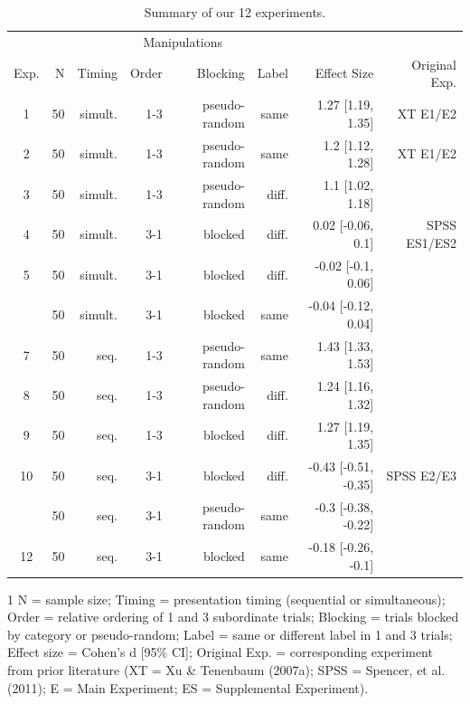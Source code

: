 \documentclass[english,floatsintext,man]{apa6}
\theoremstyle{definition}
\theoremstyle{definition}
\theoremstyle{definition}
\theoremstyle{remark}
\begin{document}
\begin{table}

\begin{threeparttable}
\caption{\label{tab:unnamed-chunk-2}Summary of our 12 experiments.}
\centering
\fontsize{12}{14}\selectfont
\begin{tabular}[t]{crrrrrrr}
\toprule
\multicolumn{2}{c}{ } & \multicolumn{4}{c}{Manipulations} & \multicolumn{1}{c}{ } \\
\cmidrule(l{2pt}r{2pt}){3-6}
Exp. & N & Timing & Order & Blocking & Label & Effect Size & Original 
Exp.\\
\midrule
1 & 50 & simult. & 1-3 & pseudo-random & same & 1.27 [1.19, 1.35] & XT E1/E2\\
2 & 50 & simult. & 1-3 & pseudo-random & same & 1.2 [1.12, 1.28] & XT E1/E2\\
3 & 50 & simult. & 1-3 & pseudo-random & diff. & 1.1 [1.02, 1.18] & \\
4 & 50 & simult. & 3-1 & blocked & diff. & 0.02 [-0.06, 0.1] & SPSS ES1/ES2\\
5 & 50 & simult. & 3-1 & blocked & diff. & -0.02 [-0.1, 0.06] & \\
\addlinespace
6 & 50 & simult. & 3-1 & blocked & same & -0.04 [-0.12, 0.04] & \\
7 & 50 & seq. & 1-3 & pseudo-random & same & 1.43 [1.33, 1.53] & \\
8 & 50 & seq. & 1-3 & pseudo-random & diff. & 1.24 [1.16, 1.32] & \\
9 & 50 & seq. & 1-3 & blocked & diff. & 1.27 [1.19, 1.35] & \\
10 & 50 & seq. & 3-1 & blocked & diff. & -0.43 [-0.51, -0.35] & SPSS E2/E3\\
\addlinespace
11 & 50 & seq. & 3-1 & pseudo-random & same & -0.3 [-0.38, -0.22] & \\
12 & 50 & seq. & 3-1 & blocked & same & -0.18 [-0.26, -0.1] & \\
\bottomrule
\end{tabular}
\begin{tablenotes}
\small
\item [1] N = sample size; Timing = presentation timing (sequential or simultaneous); Order = relative ordering of 1 and 3 subordinate trials; Blocking = trials blocked by category or pseudo-random; Label = same or different label in 1 and 3 trials; Effect size = Cohen's d [95\% CI]; Original Exp. = corresponding experiment from prior literature (XT = Xu \& Tenenbaum (2007a); SPSS =   Spencer, et al. (2011);  E = Main  Experiment; ES = Supplemental Experiment).
\end{tablenotes}
\end{threeparttable}
\end{table}
\end{document}
